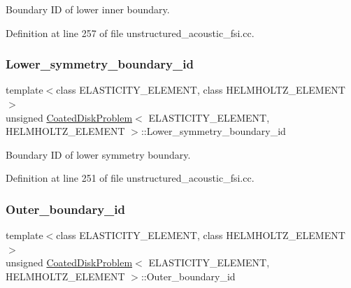 Boundary ID of lower inner boundary. 



Definition at line 257 of file unstructured\+\_\+acoustic\+\_\+fsi.\+cc.

\mbox{\label{classCoatedDiskProblem_a42d2f2b46b0b1a7add92533bd5968033}} 
\subsubsection{\texorpdfstring{Lower\+\_\+symmetry\+\_\+boundary\+\_\+id}{Lower\_symmetry\_boundary\_id}}
{\footnotesize\ttfamily template$<$class E\+L\+A\+S\+T\+I\+C\+I\+T\+Y\+\_\+\+E\+L\+E\+M\+E\+NT, class H\+E\+L\+M\+H\+O\+L\+T\+Z\+\_\+\+E\+L\+E\+M\+E\+NT$>$ \\
unsigned \hyperlink{classCoatedDiskProblem}{Coated\+Disk\+Problem}$<$ E\+L\+A\+S\+T\+I\+C\+I\+T\+Y\+\_\+\+E\+L\+E\+M\+E\+NT, H\+E\+L\+M\+H\+O\+L\+T\+Z\+\_\+\+E\+L\+E\+M\+E\+NT $>$\+::Lower\+\_\+symmetry\+\_\+boundary\+\_\+id\hspace{0.3cm}{\ttfamily [private]}}



Boundary ID of lower symmetry boundary. 



Definition at line 251 of file unstructured\+\_\+acoustic\+\_\+fsi.\+cc.

\mbox{\label{classCoatedDiskProblem_acdffaaa300e0c67b5ceb7c85925a46f0}} 
\subsubsection{\texorpdfstring{Outer\+\_\+boundary\+\_\+id}{Outer\_boundary\_id}}
{\footnotesize\ttfamily template$<$class E\+L\+A\+S\+T\+I\+C\+I\+T\+Y\+\_\+\+E\+L\+E\+M\+E\+NT, class H\+E\+L\+M\+H\+O\+L\+T\+Z\+\_\+\+E\+L\+E\+M\+E\+NT$>$ \\
unsigned \hyperlink{classCoatedDiskProblem}{Coated\+Disk\+Problem}$<$ E\+L\+A\+S\+T\+I\+C\+I\+T\+Y\+\_\+\+E\+L\+E\+M\+E\+NT, H\+E\+L\+M\+H\+O\+L\+T\+Z\+\_\+\+E\+L\+E\+M\+E\+NT $>$\+::Outer\+\_\+boundary\+\_\+id\hspace{0.3cm}{\ttfamily [private]}}




